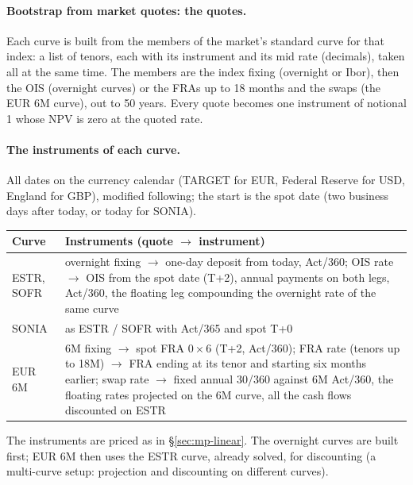 \paragraph{Bootstrap from market quotes: the quotes.} Each curve is built from the members of the market's standard
curve for that index: a list of tenors, each with its instrument and its mid rate (decimals), taken all at the same
time. The members are the index fixing (overnight or Ibor), then the OIS (overnight curves) or the FRAs up to 18
months and the swaps (the EUR 6M curve), out to 50 years. Every quote becomes one instrument of notional 1 whose NPV
is zero at the quoted rate.

\paragraph{The instruments of each curve.} All dates on the currency calendar (TARGET for EUR, Federal Reserve for USD,
England for GBP), modified following; the start is the spot date (two business days after today, or today for SONIA).
\begin{center}
\small
\begin{tabular}{@{}L{2.6cm}L{12.6cm}@{}}
\toprule
Curve & Instruments (quote $\to$ instrument) \\
\midrule
ESTR, SOFR & overnight fixing $\to$ one-day deposit from today, Act/360; OIS rate $\to$ OIS from the spot date (T+2),
  annual payments on both legs, Act/360, the floating leg compounding the overnight rate of the same curve \\
SONIA & as ESTR / SOFR with Act/365 and spot T+0 \\
EUR 6M & 6M fixing $\to$ spot FRA $0\times6$ (T+2, Act/360); FRA rate (tenors up to 18M) $\to$ FRA ending at its tenor and
  starting six months earlier; swap rate $\to$ fixed annual 30/360 against 6M Act/360, the floating rates projected on
  the 6M curve, all the cash flows discounted on ESTR \\
\bottomrule
\end{tabular}
\end{center}
The instruments are priced as in \S\ref{sec:mp-linear}. The overnight curves are built first; EUR 6M then uses the
ESTR curve, already solved, for discounting (a multi-curve setup: projection and discounting on different curves).

